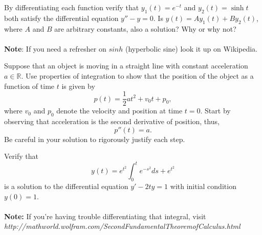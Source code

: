 \documentclass[12pt,letterpaper]{hmcpset}
\begin{document}

\begin{problem}[2]
  By differentiating each function verify that $y_1(t)=e^{-t}$ and $y_2(t)=\sinh t$ both satisfy the differential equation $y''-y=0$. Is $y(t)=Ay_1(t)+By_2(t)$, where $A$ and $B$ are arbitrary constants, also a solution? Why or why not?
  \\\\
  \textbf{Note}: If you need a refresher on $sinh$ (hyperbolic sine) look it up on Wikipedia.
\end{problem}

\begin{solution}
\vfill
\end{solution}
\newpage

\begin{problem}[3]
  Suppose that an object is moving in a straight line with constant acceleration $a \in \mathbb{R}$.  Use properties of integration to show that the position of the object as a function of time $t$ is given by $$p(t) = \frac{1}{2} a t^2 + v_0 t + p_0,$$ where $v_0$ and $p_0$ denote the velocity and position at time $t=0$.   Start by observing that acceleration is the second derivative of position, thus, 
  \[  p''(t) = a.  \]
  Be careful in your solution to rigorously justify each step.
\end{problem}

\begin{solution}
\vfill
\end{solution}
\newpage

\begin{problem}[4]
  Verify that 
  \vspace{-.25in}
  \[ y(t)=e^{t^2}\int_0^te^{-s^2}ds+e^{t^2} \]
  is a solution to the differential equation $y'-2ty=1$ with initial condition $y(0)=1$.
  \\\\
  \textbf{Note:} If you're having trouble differentiating that integral, visit\\
  \textit{http://mathworld.wolfram.com/SecondFundamentalTheoremofCalculus.html}
\end{problem}

\begin{solution}
\vfill
\end{solution}
\newpage
\end{document}

